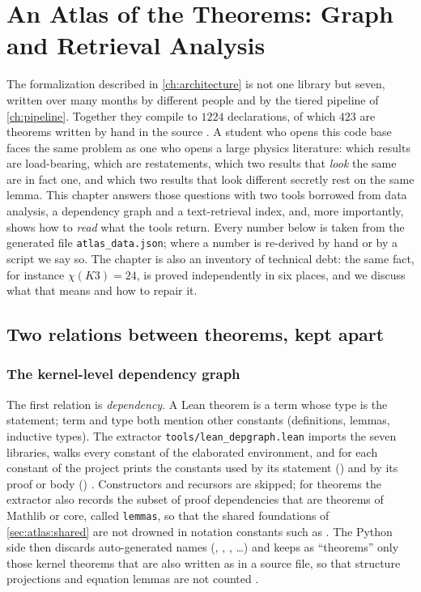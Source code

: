 \chapter{An Atlas of the Theorems: Graph and Retrieval Analysis}\label{ch:atlas}

The formalization described in \cref{ch:architecture} is not one library but seven, written
over many months by different people and by the tiered pipeline of \cref{ch:pipeline}.
Together they compile to $1224$ declarations, of which $423$ are theorems written by hand
in the source . A student who opens this code base faces the same
problem as one who opens a large physics literature: which results are load-bearing,
which are restatements, which two results that \emph{look} the same are in fact one, and
which two results that look different secretly rest on the same lemma. This chapter
answers those questions with two tools borrowed from data analysis, a dependency graph
and a text-retrieval index, and, more importantly, shows how to \emph{read} what the
tools return. Every number below is taken from the generated file
\texttt{atlas\_data.json}; where a number is re-derived by hand or by a script we say so.
The chapter is also an inventory of technical debt: the same fact, for instance
$\chi(K3)=24$, is proved independently in six places, and we discuss what that means and
how to repair it.

\section{Two relations between theorems, kept apart}\label{sec:atlas:method}

\subsection{The kernel-level dependency graph}

The first relation is \emph{dependency}. A Lean theorem is a term whose type is the
statement; term and type both mention other constants (definitions, lemmas, inductive
types). The extractor \texttt{tools/lean\_depgraph.lean} imports the seven libraries,
walks every constant of the elaborated environment, and for each constant of the project
prints the constants used by its statement () and by its
proof or body () . Constructors and recursors are skipped; for theorems the extractor also
records the subset of proof dependencies that are theorems of Mathlib or core, called
\texttt{lemmas}, so that the shared foundations of \cref{sec:atlas:shared} are not
drowned in notation constants such as  . The Python side then discards auto-generated names
(, , , \dots) and keeps as ``theorems''
only those kernel theorems that are also written as  in a source file,
so that structure projections and equation lemmas are not counted
.

